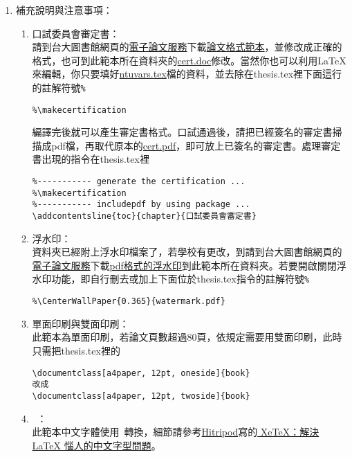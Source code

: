 \begin{acknowledgementsCH}
\begin{enumerate}[leftmargin=0pt, topsep=0pt, itemsep=0pt, label=\Roman{*}.]
\begin{enumerate}[topsep=0pt, itemsep=0pt, label=\arabic{*}.]
\end{enumerate} 
\item 補充說明與注意事項：
\begin{enumerate}[topsep=0pt, itemsep=0pt, label=$\bullet$]
    \item 口試委員會審定書：\\
    請到台大圖書館網頁的\href{http://etds.lib.ntu.edu.tw/etdsystem/submit/submitLogin}{電子論文服務}下載\href{http://gra103.aca.ntu.edu.tw/gra2007/gra/tienn/\%E5\%AD\%B8\%E4\%BD\%8D\%E8\%80\%83\%E8\%A9\%A6\%E8\%A1\%A8\%E5\%86\%8A/THESISSAMPLE.DOC}{論文格式範本}，並修改成正確的格式，也可到此範本所在資料夾的\href{run:./cert.doc}{cert.doc}修改。當然你也可以利用LaTeX來編輯，你只要填好\href{run:./ntuvars.tex}{ntuvars.tex}檔的資料，並去除在thesis.tex裡下面這行的註解符號\texttt{\%} 
    \begin{verbatim}
%\makecertification
    \end{verbatim}
    編譯完後就可以產生審定書格式。口試通過後，請把已經簽名的審定書掃描成pdf檔，再取代原本的\href{run:./cert.pdf}{cert.pdf}，即可放上已簽名的審定書。處理審定書出現的指令在thesis.tex裡 
    \begin{verbatim}
%----------- generate the certification ...
%\makecertification
%----------- includepdf by using package ...
\addcontentsline{toc}{chapter}{口試委員會審定書}

    \end{verbatim}
    \item 浮水印：\\
    資料夾已經附上浮水印檔案了，若學校有更改，到請到台大圖書館網頁的\href{http://etds.lib.ntu.edu.tw/etdsystem/submit/submitLogin}{電子論文服務}下載\href{http://etds.lib.ntu.edu.tw/files/watermark.pdf}{pdf格式的浮水印}到此範本所在資料夾。若要開啟關閉浮水印功能，即自行刪去或加上下面位於thesis.tex指令的註解符號\texttt{\%}
    \begin{verbatim}
%\CenterWallPaper{0.365}{watermark.pdf}
    \end{verbatim}
    \item 單面印刷與雙面印刷：\\
    此範本為單面印刷，若論文頁數超過80頁，依規定需要用雙面印刷，此時只需把thesis.tex裡的
    \begin{verbatim}
\documentclass[a4paper, 12pt, oneside]{book}
改成
\documentclass[a4paper, 12pt, twoside]{book}
    \end{verbatim}
    \item \XeTeX\ ：\\
    此範本中文字體使用\XeTeX\ 轉換，細節請參考\href{http://www.hitripod.com/blog/}{Hitripod}寫的\href{http://www.hitripod.com/blog/2011/04/xetex-chinese-font-cjk-latex/}{ 
XeTeX：解決 LaTeX 惱人的中文字型問題}。
    \end{enumerate} 
    \end{enumerate} 


 \end{acknowledgementsCH}